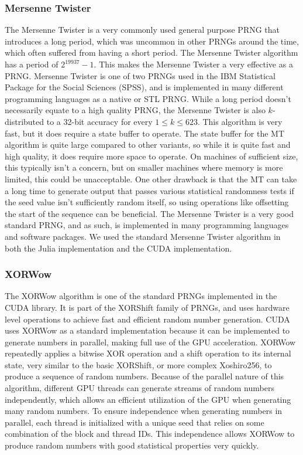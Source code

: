 \documentclass{article}
\begin{document}
            \subsubsection{Mersenne Twister}
            The Mersenne Twister is a very commonly used general purpose PRNG that introduces a long period, which was uncommon in other PRNGs around the time, which often suffered from having a short period. The Mersenne Twister algorithm has a period of $2^19937-1$. This makes the Mersenne Twister a very effective as a PRNG. Mersenne Twister is one of two PRNGs used in the IBM Statistical Package for the Social Sciences (SPSS), and is implemented in many different programming languages as a native or STL PRNG. While a long period doesn't necessarily equate to a high quality PRNG, the Mersenne Twister is also $k$-distributed to a 32-bit accuracy for every $1\leq k\leq623$. This algorithm is very fast, but it does require a state buffer to operate. The state buffer for the MT algorithm is quite large compared to other variants, so while it is quite fast and high quality, it does require more space to operate. On machines of sufficient size, this typically isn't a concern, but on smaller machines where memory is more limited, this could be unacceptable. One other drawback is that the MT can take a long time to generate output that passes various statistical randomness tests if the seed value isn't sufficiently random itself, so using operations like offsetting the start of the sequence can be beneficial. The Mersenne Twister is a very good standard PRNG, and as such, is implemented in many programming languages and software packages. We used the standard Mersenne Twister algorithm in both the Julia implementation and the CUDA implementation. 

            \subsubsection{XORWow}

The XORWow algorithm is one of the standard PRNGs implemented in the CUDA library. It is part of the XORShift family of PRNGs, and uses hardware level operations to achieve fast and efficient random number generation. CUDA uses XORWow as a standard implementation because it can be implemented to generate numbers in parallel, making full use of the GPU acceleration. XORWow repeatedly applies a bitwise XOR operation and a shift operation to its internal state, very similar to the basic XORShift, or more complex Xoshiro256, to produce a sequence of random numbers.  Because of the parallel nature of this algorithm, different GPU threads can generate streams of random numbers independently, which allows an efficient utilization of the GPU when generating many random numbers. To ensure independence when generating numbers in parallel, each thread is initialized with a unique seed that relies on some combination of the block and thread IDs. This independence allows XORWow  to produce random numbers with good statistical properties very quickly.
\end{document}
